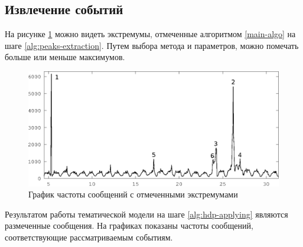 \documentclass[14pt,a4paper,oneside]{extarticle}
\begin{document}
  \subsection{Извлечение событий}
  
	На рисунке \ref{fig:all-freq-labeled} можно видеть экстремумы, отмеченные алгоритмом \ref{main-algo} на шаге \ref{alg:peaks-extraction}. Путем выбора метода и параметров, можно помечать больше или меньше максимумов. 

	 \begin{figure}[H]
	  \centering
	  \includegraphics[width=12cm]{all-freq-labeled-1.eps}
	  \caption{График частоты сообщений с отмеченными экстремумами}
	  \label{fig:all-freq-labeled}
	  \end{figure}
	  
	  Результатом работы тематической модели на шаге \ref{alg:hdp-applying} являются размеченные сообщения. На графиках показаны частоты сообщений, соответствующие рассматриваемым событиям.
	  
\end{document}
